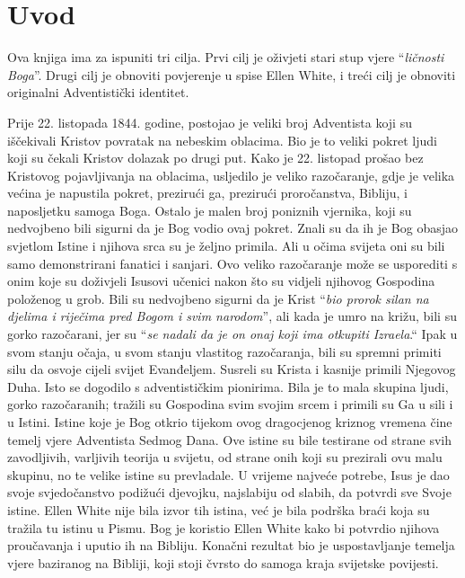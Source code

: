 \chapter*{Uvod}

Ova knjiga ima za ispuniti tri cilja. Prvi cilj je oživjeti stari stup vjere “\textit{ličnosti Boga}”. Drugi cilj je obnoviti povjerenje u spise Ellen White, i treći cilj je obnoviti originalni Adventistički identitet.

Prije 22. listopada 1844. godine, postojao je veliki broj Adventista koji su iščekivali Kristov povratak na nebeskim oblacima. Bio je to veliki pokret ljudi koji su čekali Kristov dolazak po drugi put. Kako je 22. listopad prošao bez Kristovog pojavljivanja na oblacima, usljedilo je veliko razočaranje, gdje je velika većina je napustila pokret, prezirući ga, prezirući proročanstva, Bibliju, i naposljetku samoga Boga. Ostalo je malen broj poniznih vjernika, koji su nedvojbeno bili sigurni da je Bog vodio ovaj pokret. Znali su da ih je Bog obasjao svjetlom Istine i njihova srca su je željno primila. Ali u očima svijeta oni su bili samo demonstrirani fanatici i sanjari. Ovo veliko razočaranje može se usporediti s onim koje su doživjeli Isusovi učenici nakon što su vidjeli njihovog Gospodina položenog u grob. Bili su nedvojbeno sigurni da je Krist “\textit{bio prorok silan na djelima i riječima pred Bogom i svim narodom}”, ali kada je umro na križu, bili su gorko razočarani, jer su “\textit{se nadali da je on onaj koji ima otkupiti Izraela}.“ Ipak u svom stanju očaja, u svom stanju vlastitog razočaranja, bili su spremni primiti silu da osvoje cijeli svijet Evanđeljem. Susreli su Krista i kasnije primili Njegovog Duha. Isto se dogodilo s adventističkim pionirima. Bila je to mala skupina ljudi, gorko razočaranih; tražili su Gospodina svim svojim srcem i primili su Ga u sili i u Istini. Istine koje je Bog otkrio tijekom ovog dragocjenog kriznog vremena čine temelj vjere Adventista Sedmog Dana. Ove istine su bile testirane od strane svih zavodljivih, varljivih teorija u svijetu, od strane onih koji su prezirali ovu malu skupinu, no te velike istine su prevladale. U vrijeme najveće potrebe, Isus je dao svoje svjedočanstvo podižući djevojku, najslabiju od slabih, da potvrdi sve Svoje istine. Ellen White nije bila izvor tih istina, već je bila podrška braći koja su tražila tu istinu u Pismu. Bog je koristio Ellen White kako bi potvrdio njihova proučavanja i uputio ih na Bibliju. Konačni rezultat bio je uspostavljanje temelja vjere baziranog na Bibliji, koji stoji čvrsto do samoga kraja svijetske povijesti.


